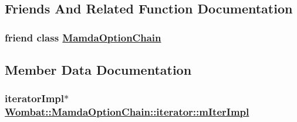\subsection{Friends And Related Function Documentation}
\hypertarget{classWombat_1_1MamdaOptionChain_1_1iterator_f3175431d241ba2aa4df7e41301ee186}{
\subsubsection[MamdaOptionChain]{\setlength{\rightskip}{0pt plus 5cm}friend class \hyperlink{classWombat_1_1MamdaOptionChain}{Mamda\-Option\-Chain}}}
\label{classWombat_1_1MamdaOptionChain_1_1iterator_f3175431d241ba2aa4df7e41301ee186}




\subsection{Member Data Documentation}
\hypertarget{classWombat_1_1MamdaOptionChain_1_1iterator_d19a66c70e409ba08eccbf18c119ba9c}{
\subsubsection[mIterImpl]{\setlength{\rightskip}{0pt plus 5cm}iterator\-Impl$\ast$ \hyperlink{classWombat_1_1MamdaOptionChain_1_1iterator_d19a66c70e409ba08eccbf18c119ba9c}{Wombat::Mamda\-Option\-Chain::iterator::m\-Iter\-Impl}}}
\label{classWombat_1_1MamdaOptionChain_1_1iterator_d19a66c70e409ba08eccbf18c119ba9c}


